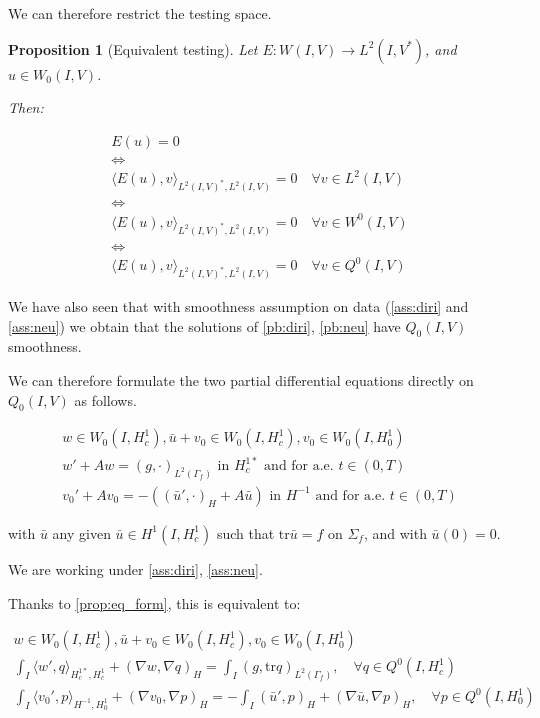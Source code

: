 \documentclass[english,a4paper,10pt,oneside]{scrbook}	%
\theoremstyle{break}
\newtheorem{prop}[equation]{Proposition}
\theoremstyle{remark}
\newcommand{\tr}{\text{tr}}
\begin{document}
We can therefore restrict the testing space.

\begin{prop}[Equivalent testing]
\label{prop:eq_test}
Let $E: W(I,V)\rightarrow L^2(I,V^*)$, and $u\in W_0(I,V)$.

Then:

\begin{align*}
E(u)=0 \\
\iff \\
\langle E(u), v\rangle_{L^2(I,V)^*, L^2(I,V)}=0 \quad \forall v \in L^2(I,V)\\
\iff \\
\langle E(u), v\rangle_{L^2(I,V)^*, L^2(I,V)}=0 \quad \forall v \in W^0(I,V)\\
\iff \\
\langle E(u), v\rangle_{L^2(I,V)^*, L^2(I,V)}=0 \quad \forall v \in Q^0(I,V)
\end{align*}

\end{prop}


We have also seen that with smoothness assumption on data (\cref{ass:diri} and \cref{ass:neu}) we obtain that the solutions of \cref{pb:diri}, \cref{pb:neu} have $Q_0(I,V)$ smoothness. 

We can therefore formulate the two partial differential equations directly on $Q_0(I,V)$ as follows.

\begin{align*}
w \in W_0(I, H^1_c),\bar{u}+v_0 \in W_0(I,H^1_c), v_0 \in W_0(I,H^1_0)\\
w' + A w = (g,\cdot)_{L^2(\Gamma_f)} \text{ in }H^{1*}_c \text{ and for a.e. } t \in (0,T) \\
v_0' + A v_0 = -((\bar{u}',\cdot)_H+A \bar{u}) \text{ in }H^{-1} \text{ and for a.e. } t \in (0,T) 
\end{align*}

with $\bar{u}$ any given $\bar{u}\in H^1(I,H^1_c)$ such that $\tr \bar{u} =f$ on $\Sigma_f$, and with $\bar{u}(0)=0$.

We are working under \ref{ass:diri}, \ref{ass:neu}.

Thanks to \cref{prop:eq_form}, this is equivalent to:

\begin{align*}
w \in W_0(I, H^1_c), \bar{u}+v_0 \in W_0(I,H^1_c), v_0 \in W_0(I,H^1_0) \\
\int_I \langle w' , q\rangle_{H^{1*}_c,H^1_c}+ (\nabla w, \nabla q)_H = \int_I(g,\tr q)_{L^2(\Gamma_f)}, \quad \forall q \in Q^0(I, H^1_c) \\
\int_I \langle v_0',p\rangle_{H^{-1},H^1_0} + (\nabla v_0, \nabla p)_H= -\int_I(\bar{u}',p)_H+(\nabla \bar{u}, \nabla p)_H, \quad \forall p \in Q^0(I, H^1_0) 
\end{align*}
\end{document}
